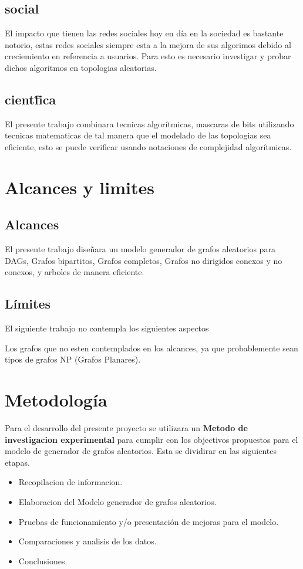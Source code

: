 \documentclass[11pt]{extarticle}
\begin{document}
  \subsection{\justificacion social}
    El impacto que tienen las redes sociales hoy en d\'ia en la sociedad es bastante notorio,
    estas redes sociales siempre esta a la mejora de sus algorimos debido al creciemiento en referencia a usuarios.
    Para esto es necesario investigar y probar dichos algoritmos en topologias aleatorias.
  \subsection{\justificacion cient\'fica}
    El presente trabajo combinara tecnicas algor\'itmicas, mascaras de bits utilizando tecnicas
    matematicas de tal manera que el modelado de las topologias sea eficiente,
    esto se puede verificar usando notaciones de complejidad algor\'itmicas.
\section{Alcances y limites}
  \subsection{Alcances}
    \begin{itemize}
      \guion El presente trabajo diseñara un modelo generador de grafos aleatorios
            para DAGs, Grafos bipartitos, Grafos completos, Grafos no dirigidos
            conexos y no conexos, y arboles de manera eficiente.
      \end{itemize}
  \subsection{L\'imites}
    El siguiente trabajo no contempla los siguientes aspectos
    \begin{itemize}
      \guion Los grafos que no esten contemplados en los alcances,
             ya que probablemente sean tipos de grafos NP (Grafos Planares).
    \end{itemize}
\section{Metodolog\'ia}
  Para el desarrollo del presente proyecto se utilizara un 
  \textbf{Metodo de investigacion experimental} para cumplir con los 
    objectivos propuestos para el modelo de generador de grafos aleatorios. 
    Esta se dividirar en las siguientes etapas.
    \begin{itemize}
      \item Recopilacion de informacion.
      \item Elaboracion del Modelo generador de grafos aleatorios.
      \item Pruebas de funcionamiento y/o presentación de mejoras para el modelo.
      \item Comparaciones y analisis de los datos.
      \item Conclusiones.
    \end{itemize}
    
\end{document}

